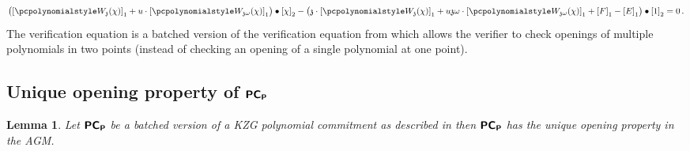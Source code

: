\documentclass[runningheads,11pt]{llncs}
\newtheorem{lemma}[theorem]{Lemma} \newtheorem{corollary}[theorem]{Corollary}
\theoremstyle{definition} \newtheorem{definition}[theorem]{Definition}
\begin{document}
\begin{description}
	\begin{multline}
		\label{eq:ver_eq}
		\left( \gone{\p{W_{\chz}}(\chi)} + u \cdot \gone{\p{W_{\chz
                \omega}}(\chi)} \right) \bullet
		\gtwo{\chi} - %
		\left( \chz \cdot \gone{\p{W_{\chz}}(\chi)} + u \chz \omega \cdot
          \gone{\p{W_{\chz \omega}}(\chi)} + \gone{F} - \gone{E} \right) \bullet
        \gtwo{1} = 0\,.
	\end{multline}
  The verification equation is a batched version of the verification equation
  from \cite{AC:KatZavGol10} which allows the verifier to check openings of
  multiple polynomials in two points (instead of checking an opening of a single
  polynomial at one point).
\end{description}

\subsection{Unique opening property of $\bm{\mathsf{PC}}_{\bm{\mathsf{P}}}$}
\begin{lemma}
\label{lem:pcomp_unique_op}
Let $\bm{\mathsf{PC}}_{\bm{\mathsf{P}}}$ be a batched version of a KZG polynomial commitment
\cite{AC:KatZavGol10} as described in \cite{EPRINT:GabWilCio19} then $\bm{\mathsf{PC}}_{\bm{\mathsf{P}}}$
has the unique opening property in the AGM. 
\end{lemma}
\end{document}
